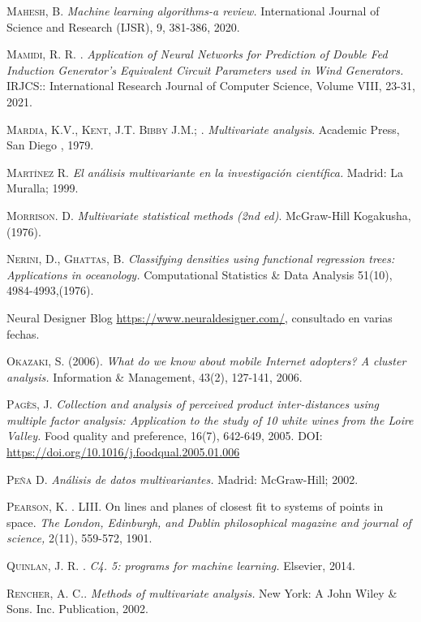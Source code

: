 \begin{thebibliography}{99}
\textsc{Mahesh, B. } \emph{Machine learning algorithms-a review.} International Journal of Science and Research (IJSR), 9, 381-386, 2020.

\textsc{Mamidi, R. R. }. \emph{Application of Neural Networks for Prediction of Double Fed Induction Generator’s Equivalent Circuit Parameters used in Wind Generators.} IRJCS:: International Research Journal of Computer Science, Volume VIII, 23-31, 2021.

\textsc{Mardia, K.V., Kent, J.T. Bibby J.M.; }. \emph{Multivariate analysis}. Academic Press, San Diego , 1979.

\textsc{Martínez R.} \emph{El análisis multivariante en la investigación científica.} Madrid: La Muralla; 1999. 

\textsc{Morrison. D.}\textit{ Multivariate statistical methods (2nd ed)}. McGraw-Hill Kogakusha,(1976).

\textsc{Nerini, D.,  Ghattas, B. }\emph{ Classifying densities using functional regression trees: Applications in oceanology.} Computational Statistics \& Data Analysis 51(10), 4984-4993,(1976).

 Neural Designer Blog \url{https://www.neuraldesigner.com/}, consultado en varias fechas. 

\textsc{Okazaki, S. (2006).}\emph{ What do we know about mobile Internet adopters? A cluster analysis.} Information \& Management, 43(2), 127-141, 2006.

\textsc{Pagès, J. } \emph{Collection and analysis of perceived product inter-distances using multiple factor analysis: Application to the study of 10 white wines from the Loire Valley.} Food quality and preference, 16(7), 642-649, 2005. DOI: \url{https://doi.org/10.1016/j.foodqual.2005.01.006
}

\textsc{Peña D.} \emph{Análisis de datos multivariantes.} Madrid: McGraw-Hill; 2002.

 \textsc{Pearson, K. }. LIII. On lines and planes of closest fit to systems of points in space. \emph{The London, Edinburgh, and Dublin philosophical magazine and journal of science,} 2(11), 559-572, 1901.

\textsc{Quinlan, J. R. }. \emph{C4. 5: programs for machine learning.} Elsevier, 2014.

 \textsc{Rencher, A. C.}. \emph{Methods of multivariate analysis.} New York: A John Wiley \& Sons. Inc. Publication, 2002.


\end{thebibliography}
